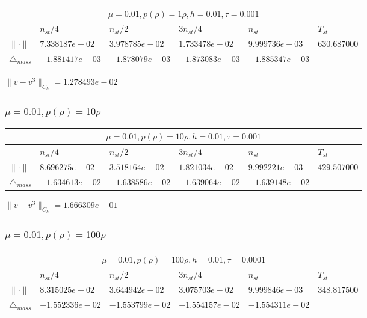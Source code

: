 \documentclass[12pt,a4paper]{article}
\begin{document}
\begin{tabular}{*{6}{|l}|}
    \hline
     \\
    \hline
    &$n_{st}/4 $&$ n_{st}/2$&$3n_{st}/4$&$n_{st}$&$T_{st}$ \\
    \hline
$\|\cdot \|$& $7.338187e-02$ & $3.978785e-02$ & $1.733478e-02$ & $9.999736e-03$ &$630.687000$\\
\hline
$\triangle_{mass}$& $-1.881417e-03$ & $-1.878079e-03$ & $-1.873083e-03$ & $-1.885347e-03$ &\\
\hline
\end{tabular}

$\|v-v^{3}\|_{C_h} = 1.278493e-02$

\subsubsection{$\mu = 0.01, p(\rho) = 10\rho $}

\begin{tabular}{*{6}{|l}|}
    \hline
     \\
    \hline
    &$n_{st}/4 $&$ n_{st}/2$&$3n_{st}/4$&$n_{st}$&$T_{st}$ \\
    \hline
    $\|\cdot \|$& $8.696275e-02$ & $3.518164e-02$ & $1.821034e-02$ & $9.992221e-03$ &$429.507000$\\
\hline
$\triangle_{mass}$& $-1.634613e-02$ & $-1.638586e-02$ & $-1.639064e-02$ & $-1.639148e-02$ &\\
\hline
\end{tabular}

$\|v-v^{3}\|_{C_h} = 1.666309e-01$

\subsubsection{$\mu = 0.01, p(\rho) = 100\rho $}

\begin{tabular}{*{6}{|l}|}
    \hline
     \\
    \hline
    &$n_{st}/4 $&$ n_{st}/2$&$3n_{st}/4$&$n_{st}$&$T_{st}$ \\
    \hline
$\|\cdot \|$& $8.315025e-02$ & $3.644942e-02$ & $3.075703e-02$ & $9.999846e-03$ &$348.817500$\\
\hline
$\triangle_{mass}$& $-1.552336e-02$ & $-1.553799e-02$ & $-1.554157e-02$ & $-1.554311e-02$ &\\
\hline
\end{tabular}
\end{document}
